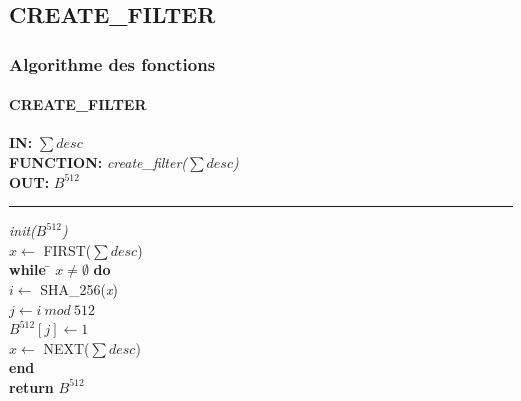 \documentclass[hyperref={pdfpagemode=FullScreen,colorlinks=true},xcolor=pst,dvips]{beamer}\usepackage[french]{babel}
\begin{document}
	\subsection{CREATE\_FILTER}
	\begin{frame}[shrink]
		\frametitle{Algorithme des fonctions}
		\framesubtitle{CREATE\_FILTER}
		\begin{framed}
		\textbf{IN:} $\sum desc$\\
		\textbf{FUNCTION:} \textit{create\_filter($\sum desc$)}\\
		\textbf{OUT:} \textit{$B^{512}$}\\

		\noindent\rule{\linewidth}{0.5pt}

		\begin{tabbing}
			\textit{init($B^{512}$)}\\
			$x \leftarrow$ FIRST($\sum desc$)\\
			\textbf{while} \= $x \neq \emptyset$ \textbf{do}\\
					\> $i \leftarrow$ SHA\_256(\textit{x})\\
					\> $j \leftarrow i\ mod\ 512$\\
					\> $B^{512}[j]\leftarrow 1$\\
					\> $x \leftarrow$ NEXT($\sum desc$)\\
			\textbf{end}\\
			\textbf{return} $B^{512}$\\
	    	\end{tabbing}		
	\end{framed}
	\end{frame}
	
\end{document}
